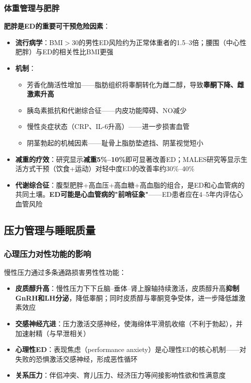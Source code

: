 \subsubsection{体重管理与肥胖}

\textbf{肥胖是ED的重要可干预危险因素}：

\begin{itemize}[leftmargin=2cm]
	\item \textbf{流行病学}：BMI$>$30的男性ED风险约为正常体重者的1.5--3倍；腰围（中心性肥胖）与ED的相关性比BMI更强
	\item \textbf{机制}：
    \begin{itemize}
    	\item 芳香化酶活性增加——脂肪组织将睾酮转化为雌二醇，导致\textbf{睾酮下降、雌激素升高}
    	\item 胰岛素抵抗和代谢综合征——内皮功能障碍、NO减少
    	\item 慢性炎症状态（CRP、IL-6升高）——进一步损害血管
    	\item 阴茎勃起的机械因素——耻骨上脂肪垫遮挡、阴茎视觉短小
    \end{itemize}
	\item \textbf{减重的疗效}：研究显示\textbf{减重5\%--10\%}即可显著改善ED；MALES研究等显示生活方式干预（饮食+运动）对轻中度ED的改善率约30\%--40\%
	\item \textbf{代谢综合征}：腹型肥胖+高血压+高血糖+高血脂的组合，是ED和心血管病的共同土壤。\textbf{ED可能是心血管病的"前哨征象"}——ED患者应在4--5年内评估心血管风险
\end{itemize}

\subsection{压力管理与睡眠质量}

\subsubsection{心理压力对性功能的影响}

慢性压力通过多条通路损害男性性功能：

\begin{itemize}[leftmargin=2cm]
	\item \textbf{皮质醇升高}：慢性压力下下丘脑--垂体--肾上腺轴持续激活，皮质醇升高\textbf{抑制GnRH和LH分泌}，降低睾酮；同时皮质醇与睾酮竞争受体，进一步降低雄激素效应
	\item \textbf{交感神经亢进}：压力激活交感神经，使海绵体平滑肌收缩（不利于勃起），并加速射精（与早泄相关）
	\item \textbf{心理性ED}：表现焦虑（performance anxiety）是心理性ED的核心机制——对失败的恐惧激活交感神经，形成恶性循环
	\item \textbf{关系压力}：伴侣冲突、育儿压力、经济压力等间接影响性欲和性满意度
\end{itemize}

